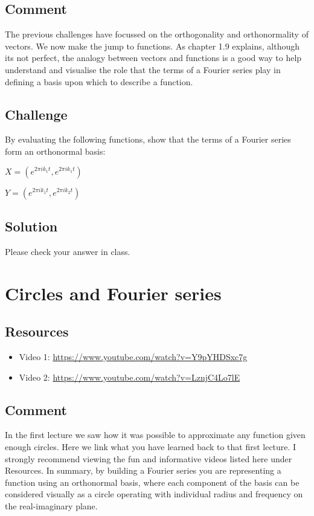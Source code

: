 \subsection*{Comment}
The previous challenges have focussed on the orthogonality and orthonormality of vectors. We now make the jump to functions. As chapter 1.9 explains, although its not perfect, the analogy between vectors and functions is a good way to help understand and visualise the role that the terms of a Fourier series play in defining a basis upon which to describe a function.

\subsection*{Challenge}
By evaluating the following functions, show that the terms of a Fourier series form an orthonormal basis:

$X = (e^{2 \pi i k_1 t}, e^{2 \pi i k_1 t})$

$Y = (e^{2 \pi i k_1 t}, e^{2 \pi i k_2 t})$

\subsection*{Solution}
Please check your answer in class.




\newpage
\section{Circles and Fourier series}

\subsection*{Resources}
\begin{itemize}
    \item Video 1: \url{https://www.youtube.com/watch?v=Y9pYHDSxc7g}
    \item Video 2: \url{https://www.youtube.com/watch?v=LznjC4Lo7lE}
\end{itemize}

\subsection*{Comment}
In the first lecture we saw how it was possible to approximate any function given enough circles. Here we link what you have learned back to that first lecture. I strongly recommend viewing the fun and informative videos listed here under Resources. In summary, by building a Fourier series you are representing a function using an orthonormal basis, where each component of the basis can be considered visually as a circle operating with individual radius and frequency on the real-imaginary plane.

